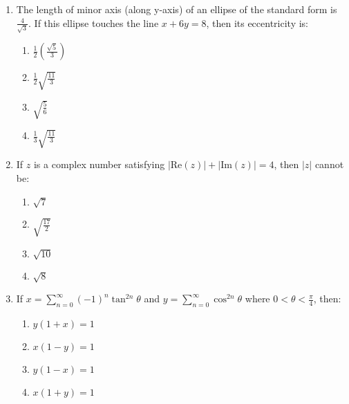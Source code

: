\documentclass[journal]{IEEEtran}
\newcommand{\abs}[1]{\left| #1 \right|}
\begin{document}
\begin{enumerate}
    \item The length of minor axis (along y-axis) of an ellipse of the standard form is \( \frac{4}{\sqrt{3}} \). If this ellipse touches the line \( x + 6y = 8 \), then its eccentricity is:
        \begin{enumerate}
            \item \( \frac{1}{2} \left( \frac{\sqrt{5}}{3} \right) \)
            \item \( \frac{1}{2} \sqrt{\frac{11}{3}} \)
            \item \( \sqrt{\frac{5}{6}} \)
            \item \( \frac{1}{3} \sqrt{\frac{11}{3}} \)
        \end{enumerate}  

    \item If \( z \) is a complex number satisfying \( \abs{\text{Re}(z)} + \abs{\text{Im}(z)} = 4 \), then \( \abs{z} \) cannot be:
        \begin{enumerate}
            \item \( \sqrt{7} \)
            \item \( \sqrt{\frac{17}{2}} \)
            \item \( \sqrt{10} \)
            \item \( \sqrt{8} \)
        \end{enumerate}

    \item If        
    \( x = \sum_{n=0}^{\infty} (-1)^{n} \tan^{2n} \theta \)  
    and
    \( y = \sum_{n=0}^{\infty} \cos^{2n} \theta \)
    where \( 0 < \theta < \frac{\pi}{4} \), then:
    \begin{enumerate}
        \item \( y(1+x) = 1 \)
        \item \( x(1-y) = 1 \)
        \item \( y(1-x) = 1 \)
        \item \( x(1+y) = 1 \)
    \end{enumerate}

\end{enumerate}
\end{document}

